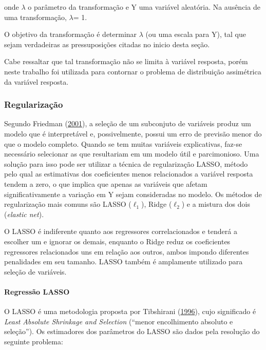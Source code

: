 \documentclass[
	12pt,				%
	a4paper,		%
	oneside,    %
	chapter=TITLE,		   %
	section=TITLE,		   %
	subsection=TITLE,	   %
	subsubsection=TITLE, %
	english,			%
	french,				%
	spanish,			%
	brazil,				%
]{abntex2}
\begin{document}
\noindent onde \(\lambda\) o parâmetro da transformação e Y uma variável
aleatória. Na ausência de uma transformação, \(\lambda\)= 1.

O objetivo da transformação é determinar \(\lambda\) (ou uma escala para
Y), tal que sejam verdadeiras as pressuposições citadas no inicio desta
seção.

Cabe ressaltar que tal transformação não se limita à variável resposta,
porém neste trabalho foi utilizada para contornar o problema de
distribuição assimétrica da variável resposta.

\hypertarget{regularizauxe7uxe3o}{%
\subsubsection{Regularização}\label{regularizauxe7uxe3o}}

Segundo Friedman (\protect\hyperlink{ref-friedman2001elements}{2001}), a
seleção de um subconjuto de variáveis produz um modelo que é
interpretável e, possivelmente, possui um erro de previsão menor do que
o modelo completo. Quando se tem muitas variáveis explicativas, faz-se
necessário selecionar as que resultariam em um modelo útil e
parcimonioso. Uma solução para isso pode ser utilizar a técnica de
regularização LASSO, método pelo qual as estimativas dos coeficientes
menos relacionados a variável resposta tendem a zero, o que implica que
apenas as variáveis que afetam significativamente a variação em Y sejam
consideradas no modelo. Os métodos de regularização mais comuns são
LASSO (\(\ell_1\)), Ridge (\(\ell_2\)) e a mistura dos dois
(\emph{elastic net}).

O LASSO é indiferente quanto aos regressores correlacionados e tenderá a
escolher um e ignorar os demais, enquanto o Ridge reduz os coeficientes
regressores relacionados uns em relação aos outros, ambos impondo
diferentes penalidades em seu tamanho. LASSO também é amplamente
utilizado para seleção de variáveis.

\hypertarget{regressuxe3o-lasso}{%
\paragraph{Regressão LASSO}\label{regressuxe3o-lasso}}

O LASSO é uma metodologia proposta por Tibshirani
(\protect\hyperlink{ref-tibshirani1996regression}{1996}), cujo
significado é \emph{Least Absolute Shrinkage and Selection} (``menor
encolhimento absoluto e seleção''). Os estimadores dos parâmetros do
LASSO são dados pela resolução do seguinte problema:
\end{document}

